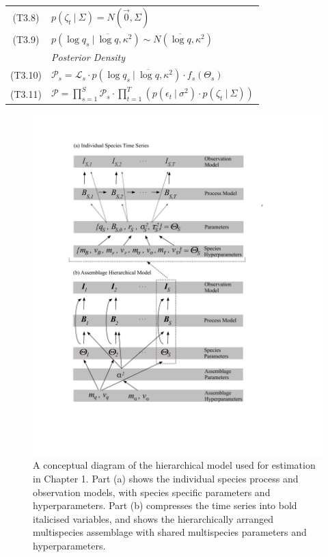\documentclass[]{scrartcl}
\begin{document}
\begin{table}[htbp]
\begin{center}
\begin{tabular}{cl}
(T3.8) &  $p \left( \zeta_{t} ~|~ \Sigma \right) = N \left( \vec{0}, \Sigma \right)$\\
(T3.9) & $p \left( \log q_s ~|~ \overline{\log q}, \kappa^2 \right) \sim N \left( \overline{\log q}, \kappa^2 \right)$ \\
& \textit{ Posterior Density } \\
(T3.10) & $\mathcal{P}_s = \mathcal{L}_s \cdot p \left( \log q_s ~|~ \overline{\log q}, \kappa^2 \right) \cdot f_s(\Theta_s)$ \\
(T3.11) & $\mathcal{P} = \prod_{s = 1}^S \mathcal{P}_s \cdot
            \prod_{t = 1}^T \left( p \left( \epsilon_{t} ~|~ \sigma^2 \right) \cdot p \left( \zeta_{t} ~|~ \Sigma \right) \right ) 
             $ \\
\hline
\end{tabular}
\end{center}
\end{table}

\newpage

\begin{figure}[htbp]
\centering
\includegraphics{figures/HBMClarkCh1.pdf}
\caption{A conceptual diagram of the hierarchical model used for estimation in Chapter 1.  Part (a) shows the individual species process and observation models, with species specific parameters and hyperparameters. Part (b) compresses the time series into bold italicised variables, and shows the hierarchically arranged multispecies assemblage with shared multispecies parameters and hyperparameters.}\label{fig:HBMCh1}
\end{figure}
\end{document}
